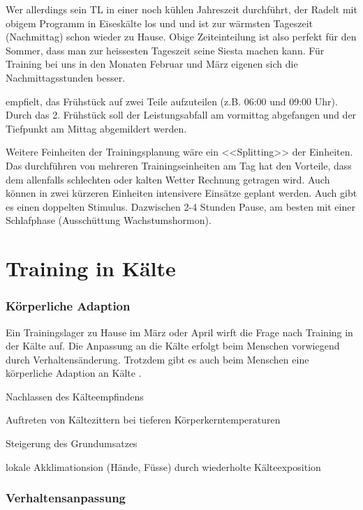 \documentclass[a4paper,DIV13,BCOR0cm,draft=TRUE]{scrartcl}
\newcommand{\Tlzh}{Trainingslager zu Hause}
\begin{document}
Wer allerdings sein TL in einer noch kühlen Jahreszeit durchführt, der Radelt mit obigem Programm
in Eiseskälte los und und ist zur wärmsten Tageszeit (Nachmittag) schon wieder zu Hause.
Obige Zeiteinteilung ist also perfekt für den Sommer, dass man zur heissesten Tageszeit seine Siesta machen kann.
Für Training bei uns in den Monaten Februar und März eigenen sich die Nachmittagsstunden besser.

 empfielt, das Frühstück auf zwei
Teile aufzuteilen (z.B. 06:00 und 09:00 Uhr). Durch das 2. Frühstück
soll der Leistungsabfall am vormittag abgefangen und der Tiefpunkt am Mittag
abgemildert werden.

Weitere Feinheiten der Trainingsplanung wäre ein <<Splitting>> der Einheiten.
Das durchführen von mehreren Trainingseinheiten am Tag hat den Vorteile,
dass dem allenfalls schlechten oder kalten Wetter Rechnung getragen wird.
Auch können in zwei kürzeren Einheiten intensivere Einsätze geplant werden.
Auch gibt es einen doppelten Stimulus.
Dazwischen 2-4 Stunden Pause, am besten mit einer Schlafphase (Ausschüttung Wachstumshormon).

\section{Training in Kälte}
\label{sec:training-in-kaelte}
\subsubsection{Körperliche Adaption}
Ein \Tlzh{} im März oder April wirft die Frage nach Training in der Kälte auf.
Die Anpassung an die Kälte erfolgt beim Menschen vorwiegend durch Verhaltensänderung.
Trotzdem gibt es auch beim Menschen eine körperliche Adaption an Kälte \cite[S. 1032]{Weineck2010}.

\begin{itemize*}
        \item Nachlassen des Kälteempfindens
        \item Auftreten von Kältezittern bei tieferen Körperkerntemperaturen
        \item Steigerung des Grundumsatzes
        \item lokale Akklimationsion (Hände, Füsse) durch wiederholte Kälteexposition
\end{itemize*}

\subsubsection{Verhaltensanpassung}
\end{document}
